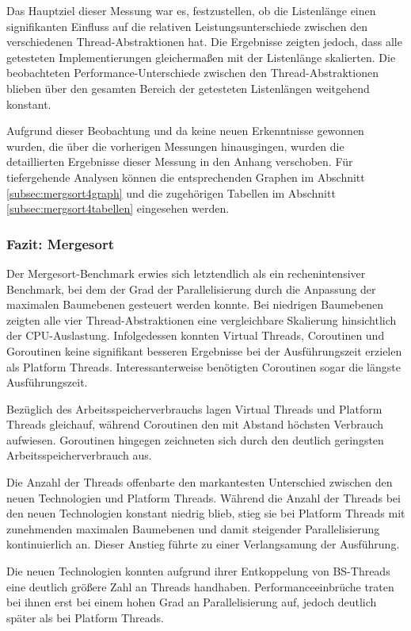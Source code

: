 \documentclass[fontsize=12pt,paper=a4,twoside=semi,parskip=half-,headsepline,headinclude]{scrreprt}
\begin{document}
Das Hauptziel dieser Messung war es, festzustellen, ob die Listenlänge einen signifikanten Einfluss auf die relativen Leistungsunterschiede zwischen den verschiedenen Thread-Abstraktionen hat. Die Ergebnisse zeigten jedoch, dass alle getesteten Implementierungen gleichermaßen mit der Listenlänge skalierten. Die beobachteten Performance-Unterschiede zwischen den Thread-Abstraktionen blieben über den gesamten Bereich der getesteten Listenlängen weitgehend konstant.

Aufgrund dieser Beobachtung und da keine neuen Erkenntnisse gewonnen wurden, die über die vorherigen Messungen hinausgingen, wurden die detaillierten Ergebnisse dieser Messung in den Anhang verschoben. Für tiefergehende Analysen können die entsprechenden Graphen im Abschnitt \ref{subsec:mergsort4graph} und die zugehörigen Tabellen im Abschnitt \ref{subsec:mergsort4tabellen} eingesehen werden.

\subsubsection{Fazit: Mergesort}

Der Mergesort-Benchmark erwies sich letztendlich als ein rechenintensiver Benchmark, bei dem der Grad der Parallelisierung durch die Anpassung der maximalen Baumebenen gesteuert werden konnte. Bei niedrigen Baumebenen zeigten alle vier Thread-Abstraktionen eine vergleichbare Skalierung hinsichtlich der CPU-Auslastung. Infolgedessen konnten Virtual Threads, Coroutinen und Goroutinen keine signifikant besseren Ergebnisse bei der Ausführungszeit erzielen als Platform Threads. Interessanterweise benötigten Coroutinen sogar die längste Ausführungszeit.

Bezüglich des Arbeitsspeicherverbrauchs lagen Virtual Threads und Platform Threads gleichauf, während Coroutinen den mit Abstand höchsten Verbrauch aufwiesen. Goroutinen hingegen zeichneten sich durch den deutlich geringsten Arbeitsspeicherverbrauch aus.

Die Anzahl der Threads offenbarte den markantesten Unterschied zwischen den neuen Technologien und Platform Threads. Während die Anzahl der Threads bei den neuen Technologien konstant niedrig blieb, stieg sie bei Platform Threads mit zunehmenden maximalen Baumebenen und damit steigender Parallelisierung kontinuierlich an. Dieser Anstieg führte zu einer Verlangsamung der Ausführung.

Die neuen Technologien konnten aufgrund ihrer Entkoppelung von BS-Threads eine deutlich größere Zahl an Threads handhaben. Performanceeinbrüche traten bei ihnen erst bei einem  hohen Grad an Parallelisierung auf, jedoch deutlich später als bei Platform Threads.
\end{document}

